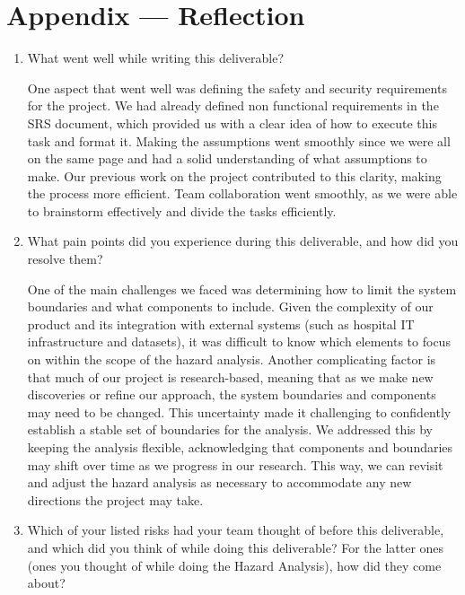\documentclass{article}
\begin{document}
\newpage{}

\section*{Appendix --- Reflection}



\begin{enumerate}
  \item What went well while writing this deliverable?

    One aspect that went well was defining the safety and security requirements for the project.
    We had already defined non functional requirements in the SRS document, which provided us with
    a clear idea of how to execute this task and format it. Making the assumptions went smoothly
    since we were all on the same page and had a solid understanding of what assumptions to
    make. Our previous work on the project contributed to this clarity, making the process more
    efficient. Team collaboration went smoothly, as we were able to brainstorm effectively and
    divide the tasks efficiently.

  \item What pain points did you experience during this deliverable, and how
    did you resolve them?

    One of the main challenges we faced was determining how to limit the system boundaries and
    what components to include. Given the complexity of our product and its integration
    with external systems (such as hospital IT infrastructure and datasets), it was difficult to
    know which elements to focus on within the scope of the hazard analysis. Another complicating
    factor is that much of our project is research-based, meaning that as we make new discoveries
    or refine our approach, the system boundaries and components may need to be changed. This
    uncertainty made it challenging to confidently establish a stable set of boundaries for the
    analysis. We addressed this by keeping the analysis flexible, acknowledging that components
    and boundaries may shift over time as we progress in our research. This way, we can revisit
    and adjust the hazard analysis as necessary to accommodate any new directions the project may
    take.

  \item Which of your listed risks had your team thought of before this
    deliverable, and which did you think of while doing this deliverable? For
    the latter ones (ones you thought of while doing the Hazard Analysis), how
    did they come about?


\end{enumerate}
\end{document}
